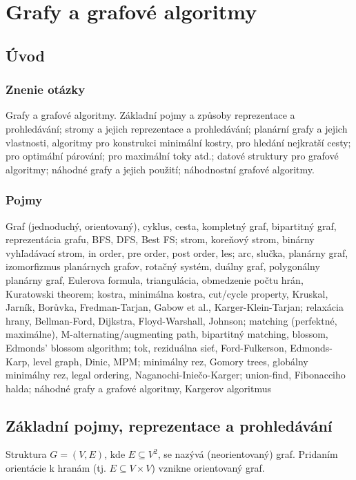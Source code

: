 \section{Grafy a grafové algoritmy}

\subsection{Úvod}
\subsubsection{Znenie otázky}
Grafy a grafové algoritmy. Základní pojmy a způsoby reprezentace
a prohledávání; stromy a jejich reprezentace a prohledávání; planární 
grafy a jejich vlastnosti, algoritmy pro konstrukci minimální kostry, 
pro hledání nejkratší cesty; pro optimální párování; pro maximální 
toky atd.; datové struktury pro grafové algoritmy; náhodné grafy a 
jejich použití; náhodnostní grafové algoritmy.

\subsubsection{Pojmy}
Graf (jednoduchý, orientovaný), cyklus, cesta, kompletný graf,
bipartitný graf, reprezentácia grafu, BFS, DFS, Best FS; strom,
koreňový strom, binárny vyhľadávací strom, in order, pre order,
post order, les; arc, slučka, planárny graf, izomorfizmus planárnych
grafov, rotačný systém, duálny graf, polygonálny planárny graf,
Eulerova formula, triangulácia, obmedzenie počtu hrán, Kuratowski theorem;
kostra, minimálna kostra, cut/cycle property, Kruskal, Jarník, 
Borůvka, Fredman-Tarjan, Gabow et al., Karger-Klein-Tarjan;
relaxácia hrany, Bellman-Ford, Dijkstra, Floyd-Warshall, Johnson;
matching (perfektné, maximálne), M-alternating/augmenting path,
bipartitný matching, blossom, Edmonds' blossom algorithm;
tok, reziduálna sieť, Ford-Fulkerson, Edmonds-Karp, level graph,
Dinic, MPM; minimálny rez, Gomory trees, globálny minimálny rez,
legal ordering, Naganochi-Iniečo-Karger;
union-find, Fibonacciho halda; náhodné grafy a grafové algoritmy,
Kargerov algoritmus

\subsection{Základní pojmy, reprezentace a prohledávání}

Struktura $G = (V, E)$, kde $E \subseteq V^2$, se nazývá (neorientovaný) graf.
Pridaním orientácie k hranám (tj. $E \subseteq V \times V$) vznikne orientovaný graf.


